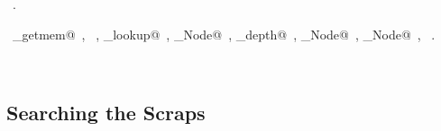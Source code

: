 \documentclass{report}
\begin{document}
\begin{flushleft}
\begin{minipage}{\linewidth}
\begin{list}{}{}
\mbox{}\verb@        m = m->next;@\\
\mbox{}\verb@      }@\\
\mbox{}\verb@      r = r->next;@\\
\mbox{}\verb@    }@\\
\mbox{}\verb@  }@\\
\mbox{}\verb@}@{\NWsep}
\end{list}
\vspace{-1ex}
\footnotesize\addtolength{\baselineskip}{-1ex}
\begin{list}{}{\setlength{\itemsep}{-\parsep}\setlength{\itemindent}{-\leftmargin}}
\item \NWtxtMacroRefIn\ .
\end{list}
\vspace{-2ex}
\footnotesize\addtolength{\baselineskip}{-1ex}
\begin{list}{}{\setlength{\itemsep}{-\parsep}\setlength{\itemindent}{-\leftmargin}}
\item \NWtxtIdentsUsed\nobreak\  \verb@arena_getmem@\nobreak\ , \verb@depths@\nobreak\ , \verb@goto_lookup@\nobreak\ , \verb@Goto_Node@\nobreak\ , \verb@max_depth@\nobreak\ , \verb@Move_Node@\nobreak\ , \verb@Name_Node@\nobreak\ , \verb@root@\nobreak\ .\end{list}
\end{minipage}\\[4ex]
\end{flushleft}
\subsection{Searching the Scraps}
\end{document}
